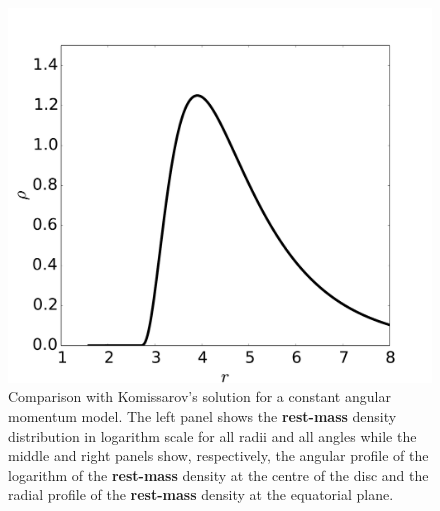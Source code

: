 \documentclass[]{aa}
\begin{document}
\begin{figure}[t]
\includegraphics[scale=0.14]{figures/fig1c.pdf}
\caption{Comparison with Komissarov's solution for a constant angular momentum model. The left panel shows the {\bf rest-mass} density distribution in logarithm scale for all radii and all angles while the middle and right panels show, respectively, the angular profile of the logarithm of the {\bf rest-mass} density at the centre of the disc and the radial profile of the {\bf rest-mass} density at the equatorial plane.}
\label{komissarov}
\end{figure}
\end{document}

